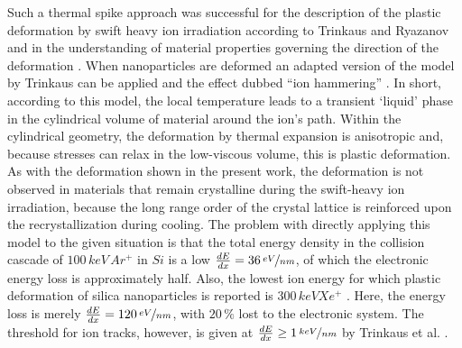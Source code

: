 Such a thermal spike approach was successful for the description of the plastic deformation by swift heavy ion irradiation according to Trinkaus and Ryazanov \cite{trinkaus_viscoelastic_1995} and in the understanding of material properties governing the direction of the deformation \cite{hedler_amorphous_2004,hedler_boundary_2005}. When nanoparticles are deformed \cite{snoeks_colloidal_2000,snoeks_colloidal_2001,van_dillen_anisotropic_2001,dillen_energy-dependent_2001,dillen_ion_2003,dillen_ion_2004} an adapted version of the model by Trinkaus can be applied and the effect dubbed ``ion hammering'' \cite{klaumunzer_ion_2004}. In short, according to this model, the local temperature leads to a transient `liquid' phase in the cylindrical volume of material around the ion's path. Within the cylindrical geometry, the deformation by thermal expansion is anisotropic and, because stresses can relax in the low-viscous volume, this is plastic deformation. As with the deformation shown in the present work, the deformation is not observed in materials that remain crystalline during the swift-heavy ion irradiation, because the long range order of the crystal lattice is reinforced upon the recrystallization during cooling. The problem with directly applying this model to the given situation is that the total energy density in the collision cascade of $100\,keV\,Ar^+$ in $Si$ is a low $\frac{dE}{dx} = 36\,\nicefrac{eV}{nm}$, of which the electronic energy loss is approximately half. Also, the lowest ion energy for which plastic deformation of silica nanoparticles is reported is $300\,keV Xe^+$ \cite{dillen_ion_2003}. Here, the energy loss is merely $\frac{dE}{dx} = 120\,\nicefrac{eV}{nm}$, with $20\,\%$ lost to the electronic system. The threshold for ion tracks, however, is given at $\frac{dE}{dx} \geq 1\,\nicefrac{keV}{nm}$ by Trinkaus et al. \cite{trinkaus_viscoelastic_1995}.

